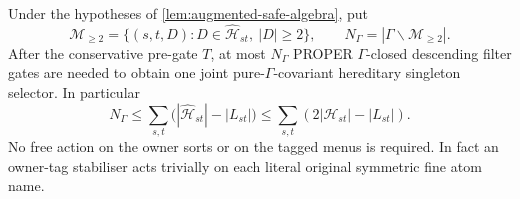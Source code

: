 \begin{corollary}
\label{cor:augmented-gamma-orbit-gate-bound}
Under the hypotheses of
\cref{lem:augmented-safe-algebra},
put
\[
 \mathscr M_{\ge2}
  =\{(s,t,D):D\in\widehat{\mathcal H}_{st},
                         \ |D|\ge2\},
 \qquad
 N_\Gamma=|\Gamma\backslash\mathscr M_{\ge2}|.
\]
After the conservative pre-gate $T$,
at most $N_\Gamma$ PROPER
$\Gamma$-closed descending filter
gates are needed to obtain one joint
pure-$\Gamma$-covariant
hereditary singleton selector.
In particular
\[
 N_\Gamma\le
 \sum_{s,t}\bigl(
       |\widehat{\mathcal H}_{st}|
                   -|L_{st}|\bigr)
 \le\sum_{s,t}
              (2|\mathcal H_{st}|-|L_{st}|).
\]
No free action on the owner sorts
or on the tagged menus is required.
In fact an owner-tag stabiliser acts
trivially on each literal original
symmetric fine atom name.
\end{corollary}

